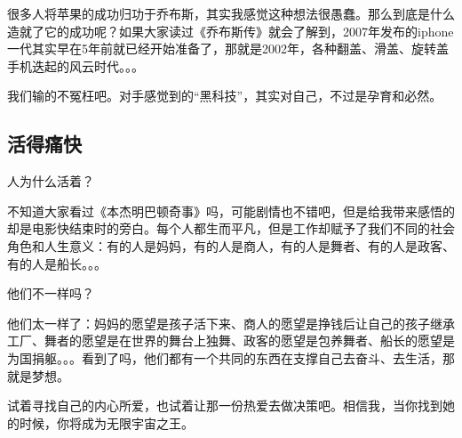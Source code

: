 \documentclass[UTF8]{ctexbook}
\begin{document}
很多人将苹果的成功归功于乔布斯，其实我感觉这种想法很愚蠢。那么到底是什么造就了它的成功呢？如果大家读过《乔布斯传》就会了解到，2007年发布的iphone一代其实早在5年前就已经开始准备了，那就是2002年，各种翻盖、滑盖、旋转盖手机迭起的风云时代。。。

我们输的不冤枉吧。对手感觉到的“黑科技”，其实对自己，不过是孕育和必然。

\subsection*{活得痛快}
人为什么活着？

不知道大家看过《本杰明巴顿奇事》吗，可能剧情也不错吧，但是给我带来感悟的却是电影快结束时的旁白。每个人都生而平凡，但是工作却赋予了我们不同的社会角色和人生意义：有的人是妈妈，有的人是商人，有的人是舞者、有的人是政客、有的人是船长。。。

他们不一样吗？

他们太一样了：妈妈的愿望是孩子活下来、商人的愿望是挣钱后让自己的孩子继承工厂、舞者的愿望是在世界的舞台上独舞、政客的愿望是包养舞者、船长的愿望是为国捐躯。。。看到了吗，他们都有一个共同的东西在支撑自己去奋斗、去生活，那就是梦想。

\hspace{2cm}

试着寻找自己的内心所爱，也试着让那一份热爱去做决策吧。相信我，当你找到她的时候，你将成为无限宇宙之王。
\end{document}
